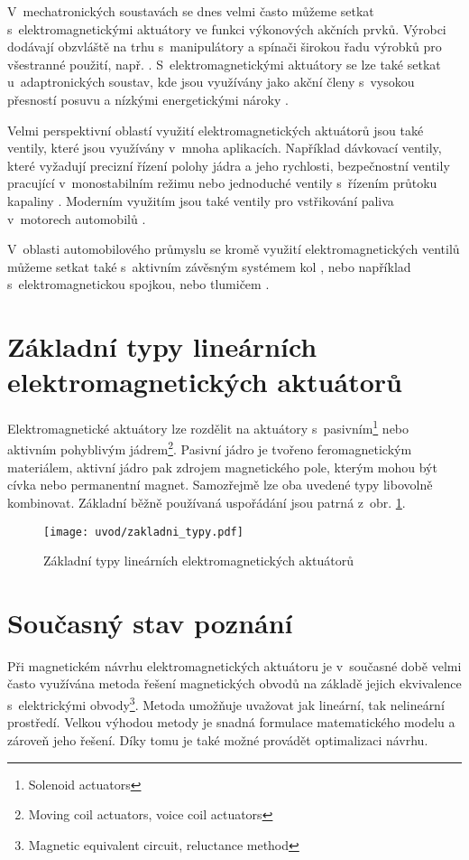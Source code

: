 V~mechatronických soustavách se dnes velmi často můžeme setkat s~elektromagnetickými aktuátory ve funkci výkonových akčních prvků. Výrobci dodávají obzvláště na trhu s~manipulátory a spínači širokou řadu výrobků pro všestranné použití, např. \cite{standardtechnologyinc.com} \cite{etogroup.com}. S~elektromagnetickými aktuátory se lze také setkat u~adaptronických soustav, kde jsou využívány jako akční členy s~vysokou přesností posuvu a nízkými energetickými nároky \cite{4134969} \cite{1252843} \cite{GomisBellmunt2007153} \cite{Lee200024}.

Velmi perspektivní oblastí využití elektromagnetických aktuátorů jsou také ventily, které jsou využívány v~mnoha aplikacích. Například dávkovací ventily, které vyžadují precizní řízení polohy jádra a jeho rychlosti, bezpečnostní ventily pracující v~monostabilním režimu nebo jednoduché ventily s~řízením průtoku kapaliny \cite{nesbitt2011handbook} \cite{5953509}. Moderním využitím jsou také ventily pro vstřikování paliva v~motorech automobilů \cite{1406108} \cite{6531035}.

V~oblasti automobilového průmyslu se kromě využití elektromagnetických ventilů můžeme setkat také s~aktivním závěsným systémem kol \cite{4677555}, nebo například s~elektromagnetickou spojkou, nebo tlumičem \cite{gysen2010active}.


\section{Základní typy lineárních\\ elektromagnetických aktuátorů}
Elektromagnetické aktuátory lze rozdělit na aktuátory s~pasivním\footnote{Solenoid actuators} nebo aktivním pohyblivým jádrem\footnote{Moving coil actuators, voice coil actuators}. Pasivní jádro je tvořeno feromagnetickým materiálem, aktivní jádro pak zdrojem magnetického pole, kterým mohou být cívka nebo permanentní magnet. Samozřejmě lze oba uvedené typy libovolně kombinovat. Základní běžně používaná uspořádání jsou patrná z~obr. \cref{obr:zakladni_typy}. \cite{gomis2010design} \cite{ulrych2009aktuatory}

\begin{figure}[h!]
  \centering
  \texttt{[image: uvod/zakladni\_typy.pdf]}
  \caption{Základní typy lineárních elektromagnetických aktuátorů}
  \label{obr:zakladni_typy}
\end{figure}

\section{Současný stav poznání}
Při magnetickém návrhu elektromagnetických aktuátoru je v~současné době velmi často využívána metoda řešení magnetických obvodů na základě jejich ekvivalence s~elektrickými obvody\footnote{Magnetic equivalent circuit, reluctance method}. Metoda umožňuje uvažovat jak lineární, tak nelineární prostředí. Velkou výhodou metody je snadná formulace matematického modelu a zároveň jeho řešení. Díky tomu je také možné provádět optimalizaci návrhu. \cite{gomis2010design} \cite{4270652}

